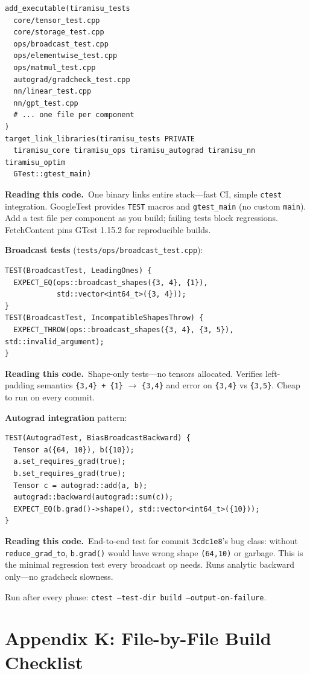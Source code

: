 \documentclass[11pt,a4paper]{article}
\newcommand{\explain}{\par\smallskip\noindent}
\newcommand{\exhead}{\textbf{Reading this code.}\ }
\begin{document}
\begin{lstlisting}[style=cmake]
add_executable(tiramisu_tests
  core/tensor_test.cpp
  core/storage_test.cpp
  ops/broadcast_test.cpp
  ops/elementwise_test.cpp
  ops/matmul_test.cpp
  autograd/gradcheck_test.cpp
  nn/linear_test.cpp
  nn/gpt_test.cpp
  # ... one file per component
)
target_link_libraries(tiramisu_tests PRIVATE
  tiramisu_core tiramisu_ops tiramisu_autograd tiramisu_nn tiramisu_optim
  GTest::gtest_main)
\end{lstlisting}
\explain\exhead One binary links entire stack---fast CI, simple \texttt{ctest} integration.
GoogleTest provides \texttt{TEST} macros and \texttt{gtest\_main} (no custom \texttt{main}).
Add a test file per component as you build; failing tests block regressions. FetchContent pins
GTest 1.15.2 for reproducible builds.

\textbf{Broadcast tests} (\texttt{tests/ops/broadcast\_test.cpp}):
\begin{lstlisting}[style=cpp]
TEST(BroadcastTest, LeadingOnes) {
  EXPECT_EQ(ops::broadcast_shapes({3, 4}, {1}),
            std::vector<int64_t>({3, 4}));
}
TEST(BroadcastTest, IncompatibleShapesThrow) {
  EXPECT_THROW(ops::broadcast_shapes({3, 4}, {3, 5}),                std::invalid_argument);
}
\end{lstlisting}
\explain\exhead Shape-only tests---no tensors allocated. Verifies left-padding semantics
\texttt{\{3,4\} + \{1\}} $\rightarrow$ \texttt{\{3,4\}} and error on \texttt{\{3,4\}} vs
\texttt{\{3,5\}}. Cheap to run on every commit.

\textbf{Autograd integration} pattern:
\begin{lstlisting}[style=cpp]
TEST(AutogradTest, BiasBroadcastBackward) {
  Tensor a({64, 10}), b({10});
  a.set_requires_grad(true);
  b.set_requires_grad(true);
  Tensor c = autograd::add(a, b);
  autograd::backward(autograd::sum(c));
  EXPECT_EQ(b.grad()->shape(), std::vector<int64_t>({10}));
}
\end{lstlisting}
\explain\exhead End-to-end test for commit \texttt{3cdc1e8}'s bug class: without
\texttt{reduce\_grad\_to}, \texttt{b.grad()} would have wrong shape \texttt{(64,10)} or garbage.
This is the minimal regression test every broadcast op needs. Runs analytic backward only---no
gradcheck slowness.

Run after every phase: \texttt{ctest --test-dir build --output-on-failure}.

\section{Appendix K: File-by-File Build Checklist}
\label{app:files}
\end{document}

